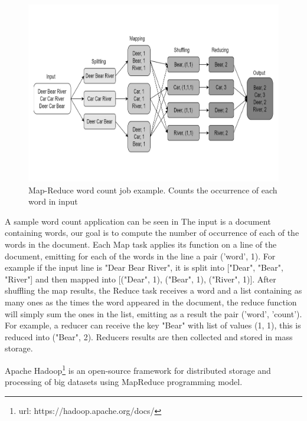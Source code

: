 \begin{figure}
	\centering
	\includegraphics[width=\columnwidth]{Images/word_count_example.pdf}  
	\caption[map-reduce model]{Map-Reduce word count job example. Counts the occurrence of each word in input}
	\label{fig:wordCountExample}
\end{figure}
A sample word count application can be seen in  The input is a document containing words, our goal is to compute the number of occurrence of each of the words in the document. Each Map task applies its function on a line of the document, emitting for each of the words in the line a pair (’word’, 1). For example if the input line is "Dear Bear River", it is split into ["Dear", "Bear", "River"] and then mapped into [("Dear", 1), ("Bear", 1), ("River", 1)]. After shuffling the map results, the Reduce task receives a word and a list containing as many ones as the times the word appeared in the document, the reduce function will simply sum the ones in the list, emitting as a
result the pair (’word’, ’count’). For example, a reducer can receive the key "Bear" with list of values (1, 1), this is reduced into ("Bear", 2). Reducers results are then collected and stored in mass storage.

Apache Hadoop\footnote{url: https://hadoop.apache.org/docs/} is an open-source framework for distributed storage and processing of big datasets using MapReduce programming model.

